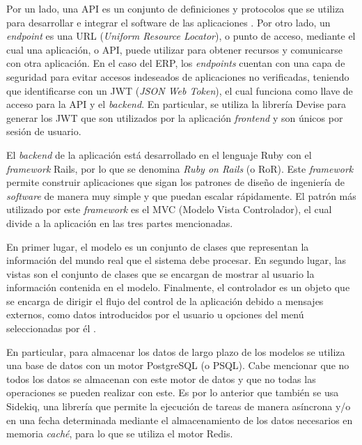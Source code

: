     Por un lado, una API es un conjunto de definiciones y protocolos que se utiliza para desarrollar e integrar el software de las aplicaciones \cite{redhat_api}. Por otro lado, un \textit{endpoint} es una URL (\textit{Uniform Resource Locator}), o punto de acceso, mediante el cual una aplicación, o API, puede utilizar para obtener recursos y comunicarse con otra aplicación. En el caso del ERP, los \textit{endpoints} cuentan con una capa de seguridad para evitar accesos indeseados de aplicaciones no verificadas, teniendo que identificarse con un JWT (\textit{JSON Web Token}), el cual funciona como llave de acceso para la API y el \textit{backend}. En particular, se utiliza la librería Devise para generar los JWT que son utilizados por la aplicación \textit{frontend} y son únicos por sesión de usuario.
    
    El \textit{backend} de la aplicación está desarrollado en el lenguaje Ruby con el \textit{framework} Rails, por lo que se denomina \textit{Ruby on Rails} (o RoR). Este \textit{framework} permite construir aplicaciones que sigan los patrones de diseño de ingeniería de \textit{software} de manera muy simple y que puedan escalar rápidamente. El patrón más utilizado por este \textit{framework} es el MVC (Modelo Vista Controlador), el cual divide a la aplicación en las tres partes mencionadas. 
    
    En primer lugar, el modelo es un conjunto de clases que representan la información del mundo real que el sistema debe procesar. En segundo lugar, las vistas son el conjunto de clases que se encargan de mostrar al usuario la información contenida en el modelo. Finalmente, el controlador es un objeto que se encarga de dirigir el flujo del control de la aplicación debido a mensajes externos, como datos introducidos por el usuario u opciones del menú seleccionadas por él \cite{mvc_architecture}.
   
   En particular, para almacenar los datos de largo plazo de los modelos se utiliza una base de datos con un motor PostgreSQL (o PSQL). Cabe mencionar que no todos los datos se almacenan con este motor de datos y que no todas las operaciones se pueden realizar con este. Es por lo anterior que también se usa Sidekiq, una librería que permite la ejecución de tareas de manera asíncrona y/o en una fecha determinada mediante el almacenamiento de los datos necesarios en memoria \textit{caché}, para lo que se utiliza el motor Redis.
   

